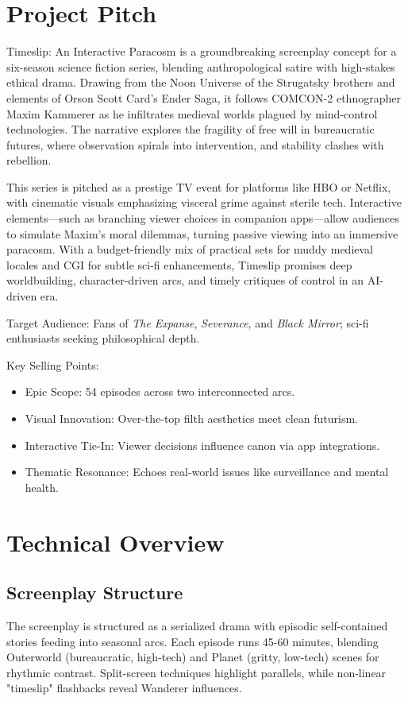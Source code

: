 \documentclass[10pt,letterpaper]{article}
\begin{document}
\begin{paracol}{2}

\section{Project Pitch}
Timeslip: An Interactive Paracosm is a groundbreaking screenplay concept for a six-season science fiction series, blending anthropological satire with high-stakes ethical drama. Drawing from the Noon Universe of the Strugatsky brothers and elements of Orson Scott Card's Ender Saga, it follows COMCON-2 ethnographer Maxim Kammerer as he infiltrates medieval worlds plagued by mind-control technologies. The narrative explores the fragility of free will in bureaucratic futures, where observation spirals into intervention, and stability clashes with rebellion.

This series is pitched as a prestige TV event for platforms like HBO or Netflix, with cinematic visuals emphasizing visceral grime against sterile tech. Interactive elements—such as branching viewer choices in companion apps—allow audiences to simulate Maxim's moral dilemmas, turning passive viewing into an immersive paracosm. With a budget-friendly mix of practical sets for muddy medieval locales and CGI for subtle sci-fi enhancements, Timeslip promises deep worldbuilding, character-driven arcs, and timely critiques of control in an AI-driven era.

Target Audience: Fans of \textit{The Expanse}, \textit{Severance}, and \textit{Black Mirror}; sci-fi enthusiasts seeking philosophical depth.

Key Selling Points:
\begin{itemize}
    \item Epic Scope: 54 episodes across two interconnected arcs.
    \item Visual Innovation: Over-the-top filth aesthetics meet clean futurism.
    \item Interactive Tie-In: Viewer decisions influence canon via app integrations.
    \item Thematic Resonance: Echoes real-world issues like surveillance and mental health.
\end{itemize}

\section{Technical Overview}
\subsection{Screenplay Structure}
The screenplay is structured as a serialized drama with episodic self-contained stories feeding into seasonal arcs. Each episode runs 45-60 minutes, blending Outerworld (bureaucratic, high-tech) and Planet (gritty, low-tech) scenes for rhythmic contrast. Split-screen techniques highlight parallels, while non-linear "timeslip" flashbacks reveal Wanderer influences.


\end{paracol}
\end{document}

